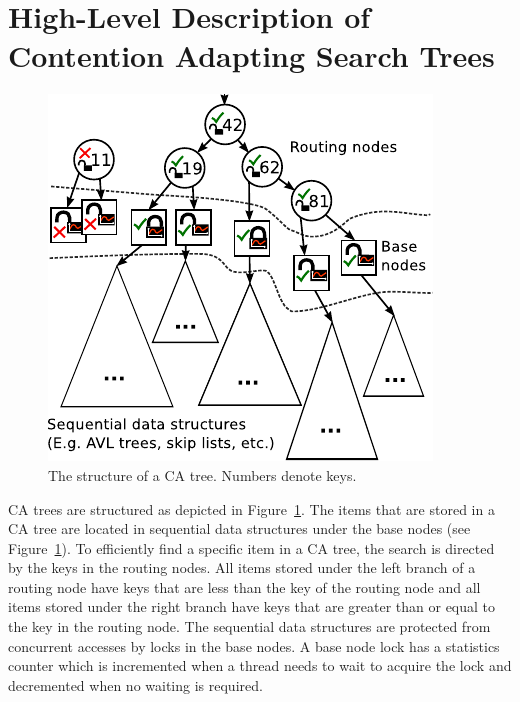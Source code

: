 \documentclass[a4paper,UKenglish]{oasics}
\newcommand{\cmark}{{\color{DarkGreen}\ding{51}}}
\newcommand{\xmark}{{\color{red}\ding{55}}}
\begin{document}
\section{High-Level Description of Contention Adapting Search Trees\label{sec:catreedesc}}
\begin{figure}
  \centering
  \includegraphics[width=.315\textwidth]{ca_tree3}
  \caption{The structure of a CA tree. Numbers denote keys.} %
  \label{fig:ca_structure}
\end{figure}
CA trees are structured as  depicted in Figure~\ref{fig:ca_structure}.
The items that are stored in a CA tree are located in sequential data structures under the base nodes (see Figure~\ref{fig:ca_structure}).
To efficiently find a specific item in a CA tree, the search is directed by the keys in the routing nodes.
All items stored under the left branch of a routing node have keys that are less than the key of the routing node and all items stored under the right branch have keys that are greater than or equal to the key in the routing node.
The sequential data structures are protected from concurrent accesses by locks in the base nodes.
A base node lock has a statistics counter which is incremented when a thread needs to wait to acquire the lock and decremented when no waiting is required.
\end{document}
